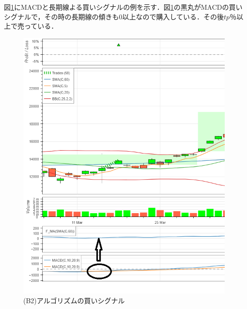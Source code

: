    図\ref{fig:macdfma}にMACDと長期線よる買いシグナルの例を示す．図\ref{fig:macdfma}の黒丸がMACDの買いシグナルで，その時の長期線の傾きも0以上なので購入している．その後$tp$％以上で売っている．
   \begin{figure}[t]
    \centering
    \includegraphics[width=110mm]{fig/macd_fma.png}
    \caption{(B2)アルゴリズムの買いシグナル}
    \label{fig:macdfma}
   \end{figure}


